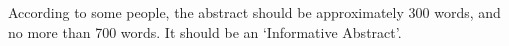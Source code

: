 \label{abstract}
According to some people, the abstract should be
approximately 300 words, and no more than 700 words. It should be an `Informative Abstract'.
